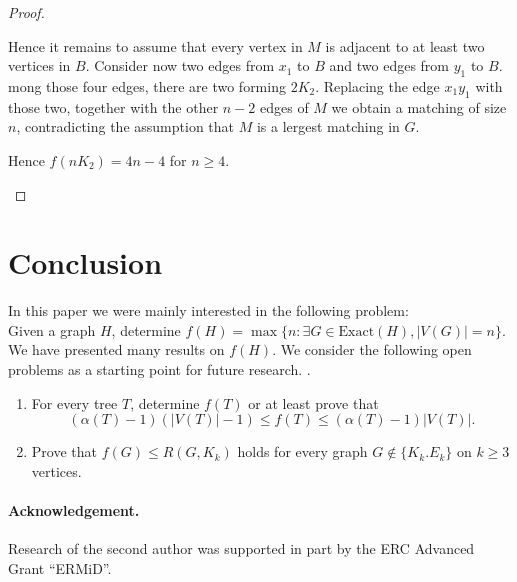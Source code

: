 \documentclass[a4paper,12pt]{article}
\begin{document}
\begin{proof}
\begin{enumerate}
{\begin{enumerate}
{Hence it remains to assume that every vertex in $M$ is adjacent  to at least two vertices in  $B$.    
Consider now two edges from $x_1$ to $B$ and two edges from $y_1$ to $B$.
mong those four edges, there are two forming $2K_2$.
Replacing the edge $x_1y_1$ with those two, together with the other $n-2$ edges of $M$ we obtain a matching of size $n$, contradicting the assumption that $M$ is a lergest matching in $G$.}


\end{enumerate}

Hence $f(nK_2)=4n-4$ for $n \geq 4$.}

\end{enumerate}
\end{proof}

\section{Conclusion}

In this paper we were mainly interested in the following problem: \\

\noindent Given a graph $H$, determine $f(H) = \max\{n : \exists G \in \text{Exact}(H), |V (G)| = n\}$.\\

We have presented many results on $f(H)$.  We consider the following open problems as a starting point for future research.  .
\begin{enumerate}
\item{For every tree $T$, determine $f(T)$ or at least prove that  \[(\alpha(T) - 1)(|V(T)| - 1) \leq f(T) \leq (\alpha(T) - 1)|V(T)|.\]}
\item{Prove that  $f(G) \leq R(G,K_k)$ holds for every graph $G \notin \{K_k. E_k\}$ on $k \geq 3$ vertices.}
\end{enumerate}


\paragraph{Acknowledgement.}

Research of the second author was supported in part by the
 ERC Advanced Grant ``ERMiD''.





 
\end{document}
